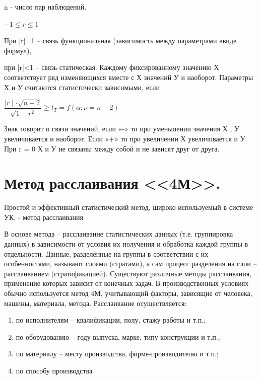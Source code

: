 \documentclass[unicode, 12pt, a4paper, oneside]{article}
\begin{document}
  n - число пар наблюдений.
  
 $ -1 \leqslant r \leqslant 1$
 
 При |r|=1 – связь функциональная (зависимость между параметрами ввиде формул),
 
при |r|<1 – связь статическая. Каждому фиксированному значению Х соответствует ряд изменяющихся вместе с Х значений У и наоборот. Параметры Х и У считаются статистически зависимыми, если
\begin{center} 
  $\dfrac{\mid r \mid \cdot \sqrt{n-2}}{\sqrt{1-r^{2}}} \geqslant t_T = f(\alpha ; \nu = n-2)$\\
  \end{center}
  
Знак говорит о связи значений, если «-» то при уменьшении значения Х , У увеличивается и наоборот. Если «+» то при увеличении Х увеличивается и У.
  При r = 0 Х и У не связаны  между собой и не зависят друг от друга.

\section{Метод расслаивания <<4М>>.}

Простой и эффективный статистический метод, широко используемый в системе УК, - метод расслаивания

В основе метода – расслаивание статистических данных (т.е. группировка данных) в зависимости от условия их получения и обработка каждой группы в отдельности. Данные, разделённые на группы в соответствии с их особенностями, называют слоями (стратами), а сам процесс разделения на слои – расслаиванием (стратификацией). Существуют различные методы расслаивания, применение которых зависит от конечных задач. В производственных условиях обычно используется метод 4М, учитывающий факторы, зависящие от человека, машины, материала, метода. Расслаивание осуществляется:
\begin{enumerate}
\item по исполнителям – квалификации, полу, стажу работы и т.п.;
\item по оборудованию – году выпуска, марке, типу конструкции  и т.п.;
\item по материалу – месту производства, фирме-производителю и т.п.;
\item по способу производства 

\end{enumerate}
\end{document}
